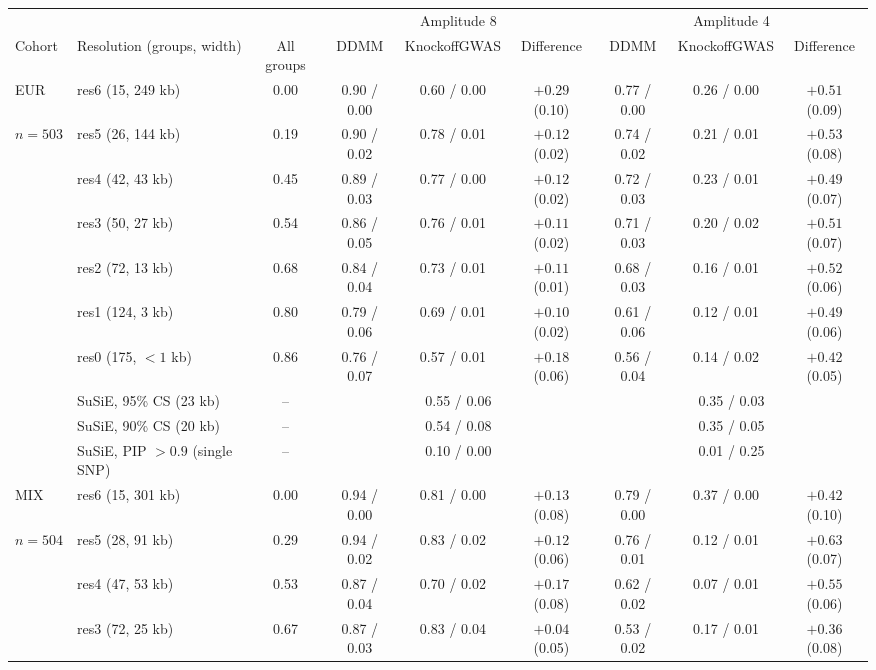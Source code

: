 \begin{tabular}{llccccccc}
\toprule
 & & & \multicolumn{3}{c}{Amplitude 8} & \multicolumn{3}{c}{Amplitude 4}\\
\cmidrule(lr){4-6}\cmidrule(lr){7-9}
Cohort & Resolution (groups, width) & All groups & DDMM & KnockoffGWAS & Difference & DDMM & KnockoffGWAS & Difference\\
\midrule
EUR & res6 (15, 249 kb) & 0.00 & 0.90 / 0.00 & 0.60 / 0.00 & $+0.29$ (0.10) & 0.77 / 0.00 & 0.26 / 0.00 & $+0.51$ (0.09)\\
$n=503$ & res5 (26, 144 kb) & 0.19 & 0.90 / 0.02 & 0.78 / 0.01 & $+0.12$ (0.02) & 0.74 / 0.02 & 0.21 / 0.01 & $+0.53$ (0.08)\\
 & res4 (42, 43 kb) & 0.45 & 0.89 / 0.03 & 0.77 / 0.00 & $+0.12$ (0.02) & 0.72 / 0.03 & 0.23 / 0.01 & $+0.49$ (0.07)\\
 & res3 (50, 27 kb) & 0.54 & 0.86 / 0.05 & 0.76 / 0.01 & $+0.11$ (0.02) & 0.71 / 0.03 & 0.20 / 0.02 & $+0.51$ (0.07)\\
 & res2 (72, 13 kb) & 0.68 & 0.84 / 0.04 & 0.73 / 0.01 & $+0.11$ (0.01) & 0.68 / 0.03 & 0.16 / 0.01 & $+0.52$ (0.06)\\
 & res1 (124, 3 kb) & 0.80 & 0.79 / 0.06 & 0.69 / 0.01 & $+0.10$ (0.02) & 0.61 / 0.06 & 0.12 / 0.01 & $+0.49$ (0.06)\\
 & res0 (175, $<1$ kb) & 0.86 & 0.76 / 0.07 & 0.57 / 0.01 & $+0.18$ (0.06) & 0.56 / 0.04 & 0.14 / 0.02 & $+0.42$ (0.05)\\
 & SuSiE, 95\% CS (23 kb) & -- & \multicolumn{3}{c}{0.55 / 0.06} & \multicolumn{3}{c}{0.35 / 0.03}\\
 & SuSiE, 90\% CS (20 kb) & -- & \multicolumn{3}{c}{0.54 / 0.08} & \multicolumn{3}{c}{0.35 / 0.05}\\
 & SuSiE, PIP $>0.9$ (single SNP) & -- & \multicolumn{3}{c}{0.10 / 0.00} & \multicolumn{3}{c}{0.01 / 0.25}\\
\midrule
MIX & res6 (15, 301 kb) & 0.00 & 0.94 / 0.00 & 0.81 / 0.00 & $+0.13$ (0.08) & 0.79 / 0.00 & 0.37 / 0.00 & $+0.42$ (0.10)\\
$n=504$ & res5 (28, 91 kb) & 0.29 & 0.94 / 0.02 & 0.83 / 0.02 & $+0.12$ (0.06) & 0.76 / 0.01 & 0.12 / 0.01 & $+0.63$ (0.07)\\
 & res4 (47, 53 kb) & 0.53 & 0.87 / 0.04 & 0.70 / 0.02 & $+0.17$ (0.08) & 0.62 / 0.02 & 0.07 / 0.01 & $+0.55$ (0.06)\\
 & res3 (72, 25 kb) & 0.67 & 0.87 / 0.03 & 0.83 / 0.04 & $+0.04$ (0.05) & 0.53 / 0.02 & 0.17 / 0.01 & $+0.36$ (0.08)\\

\end{tabular}
